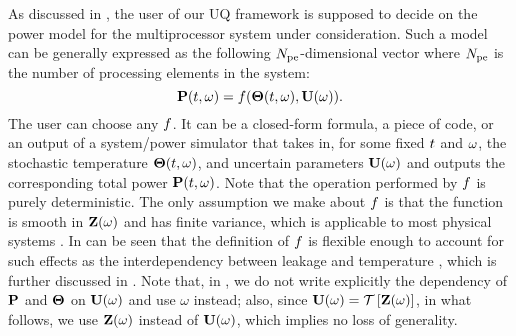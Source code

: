 As discussed in , the user of our UQ framework is supposed to decide on the power model for the multiprocessor system under consideration. Such a model can be generally expressed as the following ${N_\text{pe}}$-dimensional vector where ${N_\text{pe}}$ is the number of processing elements in the system:
\begin{equation} \elabel{power-model}
  \vP(\t, \o) = \f(\vTO(\t, \o), \vU(\o)).
\end{equation}
The user can choose any $f$. It can be a closed-form formula, a piece of code, or an output of a system/power simulator that takes in, for some fixed $t$ and $\omega$, the stochastic temperature ${\boldsymbol\Theta}(t, \omega)$, and uncertain parameters $\mathbf{U}(\omega)$ and outputs the corresponding total power $\mathbf{P}(t, \omega)$. Note that the operation performed by $f$ is purely deterministic. The only assumption we make about $f$ is that the function is smooth in $\mathbf{Z}(\omega)$ and has finite variance, which is applicable to most physical systems \cite{xiu2010}. In can be seen that the definition of $f$ is flexible enough to account for such effects as the interdependency between leakage and temperature \cite{srivastava2010, liu2007}, which is further discussed in . Note that, in , we do not write explicitly the dependency of $\mathbf{P}$ and ${\boldsymbol\Theta}$ on $\mathbf{U}(\omega)$ and use $\omega$ instead; also, since $\vU(\o) = \oTransform{\vZ(\o)}$, in what follows, we use $\mathbf{Z}(\omega)$ instead of $\mathbf{U}(\omega)$, which implies no loss of generality.
